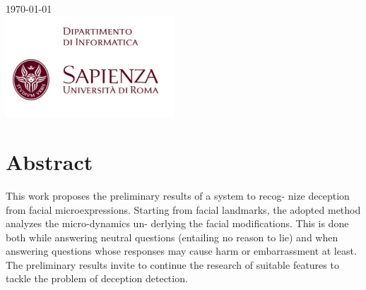 \documentclass[12pt]{article}
\begin{document}
\begin{titlepage}


{\large \today}\\[2cm] %


\includegraphics[height=3.8cm]{./Images/logo_firstpage.png}\\[3cm] %
 

\vfill %


\end{titlepage}

\tableofcontents

\newpage

\section{Abstract}

This work proposes the preliminary results of a system to recog-
nize deception from facial microexpressions. Starting from facial
landmarks, the adopted method analyzes the micro-dynamics un-
derlying the facial modifications. This is done both while answering
neutral questions (entailing no reason to lie) and when answering
questions whose responses may cause harm or embarrassment at
least. The preliminary results invite to continue the research of
suitable features to tackle the problem of deception detection.
\end{document}

